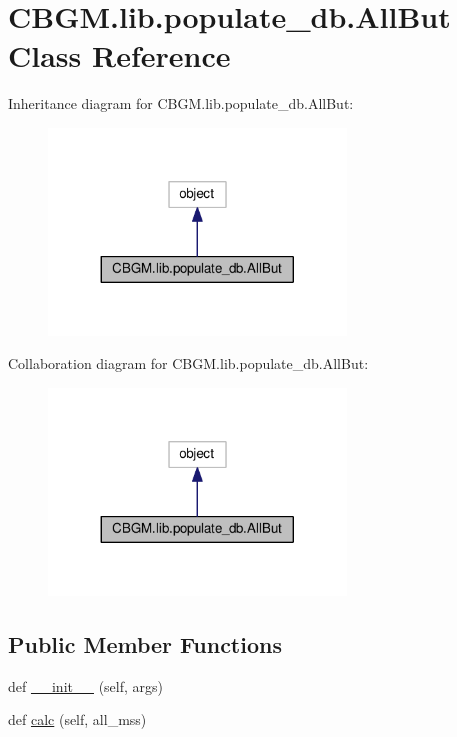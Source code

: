 \hypertarget{classCBGM_1_1lib_1_1populate__db_1_1AllBut}{}\section{C\+B\+G\+M.\+lib.\+populate\+\_\+db.\+All\+But Class Reference}
\label{classCBGM_1_1lib_1_1populate__db_1_1AllBut}


Inheritance diagram for C\+B\+G\+M.\+lib.\+populate\+\_\+db.\+All\+But\+:
\nopagebreak
\begin{figure}[H]
\begin{center}
\leavevmode
\includegraphics[width=224pt]{classCBGM_1_1lib_1_1populate__db_1_1AllBut__inherit__graph}
\end{center}
\end{figure}


Collaboration diagram for C\+B\+G\+M.\+lib.\+populate\+\_\+db.\+All\+But\+:
\nopagebreak
\begin{figure}[H]
\begin{center}
\leavevmode
\includegraphics[width=224pt]{classCBGM_1_1lib_1_1populate__db_1_1AllBut__coll__graph}
\end{center}
\end{figure}
\subsection*{Public Member Functions}
\begin{DoxyCompactItemize}
\item 
def \hyperlink{classCBGM_1_1lib_1_1populate__db_1_1AllBut_a72372c14b1f22d6c9e9198fa1a34e8b5}{\+\_\+\+\_\+init\+\_\+\+\_\+} (self, args)
\item 
def \hyperlink{classCBGM_1_1lib_1_1populate__db_1_1AllBut_a6995522e0673c3b666c2e996d1e38b93}{calc} (self, all\+\_\+mss)
\end{DoxyCompactItemize}
